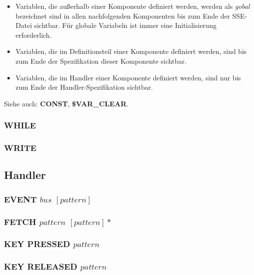 \documentclass{scrartcl}
\begin{document}
\begin{itemize}
	\item Variablen, die außerhalb einer Komponente definiert werden, werden als \textit{gobal} bezeichnet sind in allen nachfolgenden Komponenten bis zum Ende der SSE-Datei sichtbar. Für globale Variabeln ist immer eine Initialisierung erforderlich.
	\item Variablen, die im Definitionsteil einer Komponente definiert werden, sind bis zum Ende der Spezifikation dieser Komponente sichtbar.
	\item Variablen, die im Handler einer Komponente definiert werden, sind nur bis zum Ende der Handler-Spezifikation sichtbar.
\end{itemize}

\vspace{10pt}
\noindent Siehe auch: \textbf{CONST}, \textbf{\$VAR\_CLEAR}.

\subsubsection{WHILE}

\subsubsection{WRITE}

\subsection{Handler}
\label{subsec:handlerref}

\subsubsection{EVENT $bus$ $[pattern]$}

\subsubsection{FETCH $pattern$ $[pattern]*$}

\subsubsection{KEY PRESSED $pattern$}

\subsubsection{KEY RELEASED $pattern$}
\end{document}
